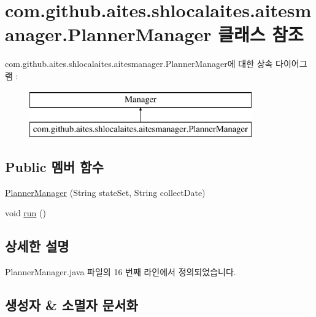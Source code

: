 \hypertarget{classcom_1_1github_1_1aites_1_1shlocalaites_1_1aitesmanager_1_1_planner_manager}{}\section{com.\+github.\+aites.\+shlocalaites.\+aitesmanager.\+Planner\+Manager 클래스 참조}
\label{classcom_1_1github_1_1aites_1_1shlocalaites_1_1aitesmanager_1_1_planner_manager}
com.\+github.\+aites.\+shlocalaites.\+aitesmanager.\+Planner\+Manager에 대한 상속 다이어그램 \+: \begin{figure}[H]
\begin{center}
\leavevmode
\includegraphics[height=2.000000cm]{classcom_1_1github_1_1aites_1_1shlocalaites_1_1aitesmanager_1_1_planner_manager}
\end{center}
\end{figure}
\subsection*{Public 멤버 함수}
\begin{DoxyCompactItemize}
\item 
\mbox{\hyperlink{classcom_1_1github_1_1aites_1_1shlocalaites_1_1aitesmanager_1_1_planner_manager_a9a75c98ac376285ae905764489ec2637}{Planner\+Manager}} (String state\+Set, String collect\+Date)
\item 
void \mbox{\hyperlink{classcom_1_1github_1_1aites_1_1shlocalaites_1_1aitesmanager_1_1_planner_manager_a1f82642f05240aeac42eabfb3f650e26}{run}} ()
\end{DoxyCompactItemize}


\subsection{상세한 설명}


Planner\+Manager.\+java 파일의 16 번째 라인에서 정의되었습니다.



\subsection{생성자 \& 소멸자 문서화}
\mbox{\label{classcom_1_1github_1_1aites_1_1shlocalaites_1_1aitesmanager_1_1_planner_manager_a9a75c98ac376285ae905764489ec2637}} 
